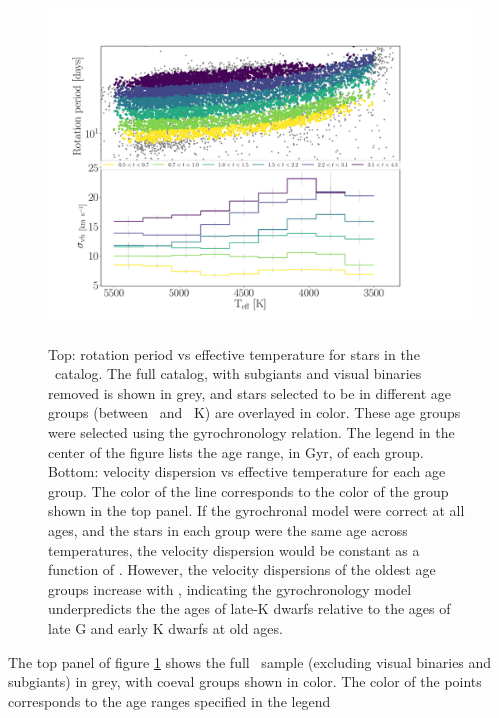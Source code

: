 \begin{figure}
  \caption{
Top: rotation period vs effective temperature for stars in the \mct\
    catalog.
    The full catalog, with subgiants and visual binaries removed is shown in
    grey, and stars selected to be in different age groups (between \tmin\ and
    \tmax\ K) are overlayed in color.
These age groups were selected using the \citet{angus2019} gyrochronology
    relation.
The legend in the center of the figure lists the age range, in Gyr, of each
    group.
Bottom: velocity dispersion vs effective temperature for each age
    group.
The color of the line corresponds to the color of the group shown in the top
    panel.
If the gyrochronal model were correct at all ages, and the stars in each group
    were the same age across temperatures, the velocity dispersion would be
    constant as a function of \teff.
However, the velocity dispersions of the oldest age groups increase with
    \teff, indicating the \citet{angus2019} gyrochronology model underpredicts
    the the ages of late-K dwarfs relative to the ages of late G and early K
    dwarfs at old ages.
}
  \centering
    \includegraphics[width=1\textwidth]{age_cut}
\label{fig:age_cut}
\end{figure}
The top panel of figure \ref{fig:age_cut} shows the full \mct\ sample
(excluding visual binaries and subgiants) in grey, with coeval groups shown in
color.
The color of the points corresponds to the age ranges specified in the legend
